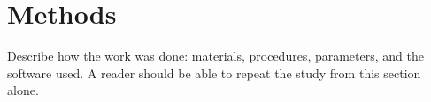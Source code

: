 \section{Methods}

Describe how the work was done: materials, procedures, parameters, and the
software used. A reader should be able to repeat the study from this section
alone.
